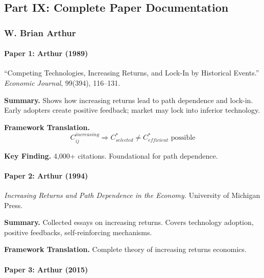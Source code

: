 \subsection{Part IX: Complete Paper Documentation}

\subsubsection{W. Brian Arthur}

\paragraph{Paper 1: Arthur (1989)}

``Competing Technologies, Increasing Returns, and Lock-In by Historical Events.''
\textit{Economic Journal}, 99(394), 116--131.

\textbf{Summary.}
Shows how increasing returns lead to path dependence and lock-in.
Early adopters create positive feedback; market may lock into inferior technology.

\textbf{Framework Translation.}
\begin{equation}
C_{ij}^{increasing} \Rightarrow C^*_{selected} \neq C^*_{efficient} \text{ possible}
\end{equation}

\textbf{Key Finding.}
4,000+ citations. Foundational for path dependence.

\paragraph{Paper 2: Arthur (1994)}

\textit{Increasing Returns and Path Dependence in the Economy.}
University of Michigan Press.

\textbf{Summary.}
Collected essays on increasing returns. Covers technology adoption, 
positive feedbacks, self-reinforcing mechanisms.

\textbf{Framework Translation.}
Complete theory of increasing returns economics.

\paragraph{Paper 3: Arthur (2015)}

